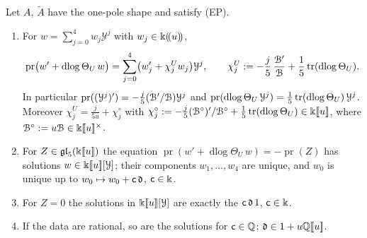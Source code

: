 \begin{lem}
\label{lem:gau-scal}
Let $A$, $\tilde A$ have the one-pole shape and satisfy (EP).
\begin{enumerate}
\item[(a)] For $w=\sum_{j=0}^4w_j\mathcal Y^j$ with $w_j\in\Bbbk(\!(u)\!)$,
\[
\operatorname{pr}\bigl(w'+\operatorname{dlog}\Theta_U\,w\bigr)=\sum_{j=0}^4\bigl(w_j'+\chi^U_jw_j\bigr)\mathcal Y^j,\qquad \chi^U_j:=-\frac j5\,\frac{\mathcal{B}'}{\mathcal{B}}+\frac15\operatorname{tr}(\operatorname{dlog}\Theta_U).
\]
In particular $\operatorname{pr}((\mathcal Y^j)')=-\frac j5(\mathcal{B}'/\mathcal{B})\mathcal Y^j$ and $\operatorname{pr}(\operatorname{dlog}\Theta_U\,\mathcal Y^j)=\frac15\operatorname{tr}(\operatorname{dlog}\Theta_U)\,\mathcal Y^j$. Moreover $\chi^U_j=\frac j{5u}+\chi^\circ_j$ with $\chi^\circ_j:=-\frac j5(\mathcal{B}^\circ)'/\mathcal{B}^\circ+\frac15\operatorname{tr}(\operatorname{dlog}\Theta_U)\in\Bbbk[\![ u ]\!]$, where $\mathcal{B}^\circ:=u\mathcal{B}\in\Bbbk[\![ u ]\!]^\times$.
\item[(b)] For $Z\in\mathfrak{gl}_5(\Bbbk[\![ u ]\!])$ the equation $\operatorname{pr}(w'+\operatorname{dlog}\Theta_U\,w)=-\operatorname{pr}(Z)$ has solutions $w\in\Bbbk[\![ u ]\!][\mathcal Y]$; their components $w_1,\dots,w_4$ are unique, and $w_0$ is unique up to $w_0\mapsto w_0+\mathsf{c}\,\mathfrak d$, $\mathsf{c}\in\Bbbk$.
\item[(c)] For $Z=0$ the solutions in $\Bbbk[\![ u ]\!][\mathcal Y]$ are exactly the $\mathsf{c}\,\mathfrak d\,1$, $\mathsf{c}\in\Bbbk$.
\item[(d)] If the data are rational, so are the solutions for $\mathsf{c}\in\mathbb{Q}$; $\mathfrak d\in1+u\mathbb{Q}[\![ u ]\!]$.
\end{enumerate}
\end{lem}

